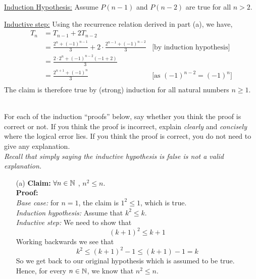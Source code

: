 \documentclass[11pt]{article}
\newif\ifsolutions
\renewcommand{\answer}[1]{{\color{mydarkblue}\textbf{Solutions: }#1}}
\begin{document}
\begin{qunlist}
\begin{itemize}
{\underline{Induction Hypothesis:} Assume $P(n-1)$ and $P(n-2)$ are true for all $n > 2$.

\underline{Inductive step:} Using the recurrence relation derived in part (a), we have,
\begin{align*} 
T_n &= T_{n-1} + 2T_{n-2} \\
&= \frac{2^n + (-1)^{n-1}}{3}+2\cdot\frac{2^{n-1}+(-1)^{n-2}}{3}  &\text{[by induction hypothesis]} \\
&= \frac{2\cdot 2^n+(-1)^{n-2}(-1+2)}{3} \\
&= \frac{2^{n+1}+(-1)^n}{3}  &\text{[as } (-1)^{n-2} = (-1)^n \text{]} \\
\end{align*}
The claim is therefore true by (strong) induction for all natural numbers $n \geq 1$.
}
\fi


\end{itemize}



\pagebreak

 \\
For each of the induction ``proofs'' below, say whether you think the proof is correct or not.
If you think the proof is incorrect, 
explain \textit{clearly} and \textit{concisely} where the logical error lies.
If you think the proof is correct, you do not need to give any explanation. \\
\textit{Recall that simply saying the inductive hypothesis is false is not a valid explanation.}

\begin{itemize}
\item[(a)] \textbf{Claim:} $\forall n \in \mathbb{N}$ , $n^2 \leq n$. \\
\textbf{Proof:} \\
\textit{Base case:} for $n = 1$, the claim is $1^2 \leq 1$, which is true. \\
\textit{Induction hypothesis:} Assume that $k^2 \leq k$. \\
\textit{Inductive step:} We need to show that 
\[ (k+1)^2 \leq k+1\]
Working backwards we see that 
\[ k^2 \leq (k+1)^2 - 1 \leq (k+1) - 1 = k \]
So we get back to our original hypothesis which is assumed to be true.\\
Hence, for every $n \in \mathbb{N}$, we know that $n^2 \leq n$. 

\ifsolutions
\answer{
The claim is clearly false as $2^2 > 2$, so the proof must be incorrect.\\
The base case and the induction hypothesis do not have any errors. The flaw lies in the inductive step.
In fact, working backwards, the proof \textit{implicitly} assumes that $(k+1)^2 \leq k+1$.
But this is what we are trying to prove, we cannot assume it!
}
\fi



\end{itemize}
\end{qunlist}
\end{document}
